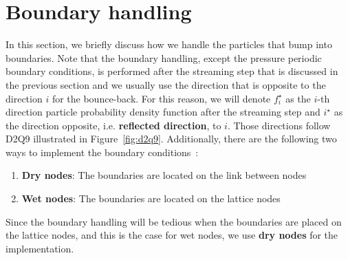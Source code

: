 \section{Boundary handling}\label{boundary-handling-section}
In this section, we briefly discuss how we handle
the particles that bump into boundaries.
Note that the boundary handling,
except the pressure periodic boundary conditions,
is performed
after the streaming step that is discussed in the previous section
and we usually use the direction that is opposite to
the direction $i$ for the bounce-back.
For this reason, we will denote
$f^\star_i$ as the $i$-th direction
particle probability density function
after the streaming step
and $i^\star$ as the direction opposite,
i.e. {\bf reflected direction}, to $i$.
Those directions follow D2Q9 illustrated
in Figure~\ref{fig:d2q9}.
Additionally, there are the following
two ways to
implement the boundary conditions~\cite{liu2014lattice}:
\begin{enumerate}
  \item {\bf Dry nodes}:
  The boundaries are located on the link between nodes
  \item {\bf Wet nodes}:
  The boundaries are located on the lattice nodes
\end{enumerate}
Since the boundary handling will be tedious when
the boundaries are placed on the lattice nodes,
and this is the case for wet nodes,
we use {\bf dry nodes} for the implementation.

